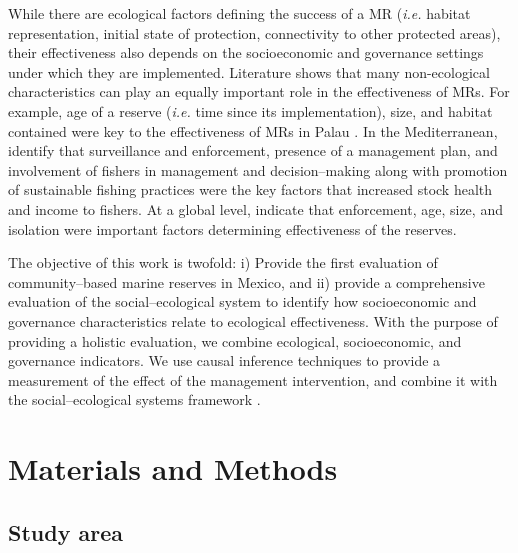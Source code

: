 \documentclass{frontiersSCNS}
\theoremstyle{definition}
\theoremstyle{definition}
\theoremstyle{definition}
\theoremstyle{remark}
\begin{document}
While there are ecological factors defining the success of a MR
(\emph{i.e.} habitat representation, initial state of protection,
connectivity to other protected areas), their effectiveness also depends
on the socioeconomic and governance settings under which they are
implemented. Literature shows that many non-ecological characteristics
can play an equally important role in the effectiveness of MRs. For
example, age of a reserve (\emph{i.e.} time since its implementation),
size, and habitat contained were key to the effectiveness of MRs in
Palau \citep{friedlander_2017-oI}. In the Mediterranean,
\citet{difranco_2016-Xw} identify that surveillance and enforcement,
presence of a management plan, and involvement of fishers in management
and decision--making along with promotion of sustainable fishing
practices were the key factors that increased stock health and income to
fishers. At a global level, \citet{edgar_2014-UO} indicate that
enforcement, age, size, and isolation were important factors determining
effectiveness of the reserves.

The objective of this work is twofold: i) Provide the first evaluation
of community--based marine reserves in Mexico, and ii) provide a
comprehensive evaluation of the social--ecological system to identify
how socioeconomic and governance characteristics relate to ecological
effectiveness. With the purpose of providing a holistic evaluation, we
combine ecological, socioeconomic, and governance indicators. We use
causal inference techniques to provide a measurement of the effect of
the management intervention, and combine it with the social--ecological
systems framework \citep{ostrom_2009-hg}.

\section{Materials and Methods}\label{materials-and-methods}

\subsection{Study area}\label{study-area}
\end{document}
